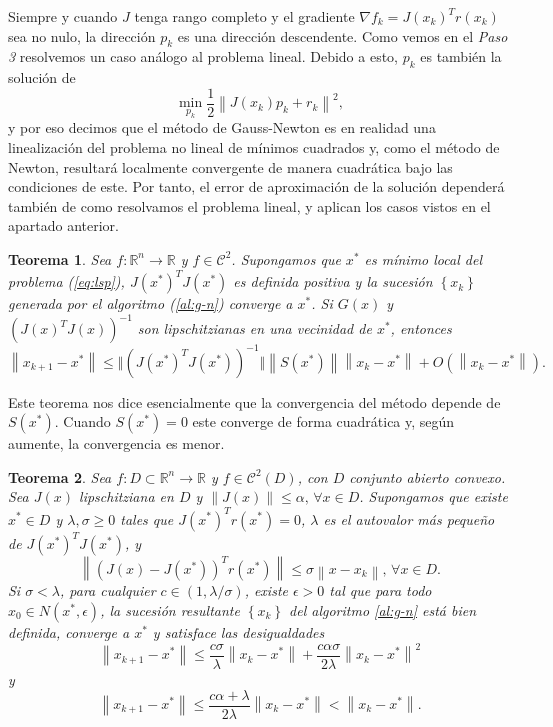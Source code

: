 \documentclass[11pt,a4paper]{book}
\newtheorem{theorem}{Teorema}[chapter]
\theoremstyle{definition}
\theoremstyle{remark}
\newcommand{\norm}[1]{\left\lVert#1\right\rVert}
\newcommand{\sucesionxk}{\left\{x_k\right\}}
\begin{document}
Siempre y cuando $J$ tenga rango completo y el gradiente $\nabla f_k = J(x_k)^Tr(x_k)$ sea no nulo, la dirección $p_k$ es una dirección descendente.
Como vemos en el \textit{Paso 3} resolvemos un caso análogo al problema lineal. Debido a esto, $p_k$ es también la solución de
\begin{equation}
	\min_{p_k} \frac{1}{2} \norm{J(x_k)p_k + r_k}^2,
\end{equation}
y por eso decimos que el método de Gauss-Newton es en realidad una linealización del problema no lineal de mínimos cuadrados y, como el método de Newton, resultará localmente convergente de manera cuadrática bajo las condiciones de este.
Por tanto, el error de aproximación de la solución dependerá también de como resolvamos el problema lineal, y aplican los casos vistos en el apartado anterior.

\begin{theorem}
	\label{th:gn1}
	Sea $f: \mathbb{R}^n \rightarrow \mathbb{R}$ y $f \in \mathcal{C}^2$. Supongamos que $x^*$ es mínimo local del problema (\ref{eq:lsp}), $J(x^*)^TJ(x^*)$ es definida positiva y la sucesión $\sucesionxk$ generada por el algoritmo (\ref{al:g-n}) converge a $x^*$. Si $G(x)$ y $(J(x)^TJ(x))^{-1}$ son lipschitzianas en una vecinidad de $x^*$, entonces
\begin{equation}
	\norm{x_{k+1}-x^*} \leq \Vert (J(x^*)^TJ(x^*))^{-1} \Vert \norm{S(x^*)} \norm{x_k-x^*}
	+ O(\norm{x_k-x^*}).
\end{equation}
\end{theorem}

Este teorema nos dice esencialmente que la convergencia del método depende de $S(x^*)$. Cuando $S(x^*)=0$ este converge de forma cuadrática y, según aumente, la convergencia es menor.

\begin{theorem}
	\label{th:gn2}
	Sea $f:D \subset \mathbb{R}^n \rightarrow \mathbb{R}$ y $f \in \mathcal{C}^2(D)$, con $D$ conjunto abierto convexo. Sea $J(x)$ lipschitziana en $D$ y $\norm{J(x)} \leq \alpha, \, \forall x \in D$. Supongamos que existe $x^* \in D$ y $\lambda, \sigma \geq 0$ tales que $J(x^*)^Tr(x^*)=0$,
$\lambda$ es el autovalor más pequeño de $J(x^*)^TJ(x^*)$, y
	\begin{equation}
		\norm{(J(x)-J(x^*))^Tr(x^*)} \leq \sigma \norm{x-x_k},\,\forall x \in D.
	\end{equation}
	Si $\sigma < \lambda$, para cualquier $c\in (1,\lambda / \sigma)$, existe $\epsilon > 0$ tal que para todo $x_0 \in N(x^*, \epsilon)$, la sucesión resultante $\sucesionxk$ del algoritmo \ref{al:g-n} está bien definida, converge a $x^*$ y satisface las desigualdades
	\begin{equation}
	\norm{x_{k+1}-x^*} \leq \frac{c\sigma}{\lambda} \norm{x_k-x^*}+\frac{c\alpha\sigma}{2\lambda}\norm{x_k-x^*}^2
	\end{equation}
	y
	\begin{equation}
	\norm{x_{k+1}-x^*} \leq \frac{c\alpha+\lambda}{2\lambda}\norm{x_k-x^*} < \norm{x_k-x^*}.
	\end{equation}
\end{theorem}
\end{document}
